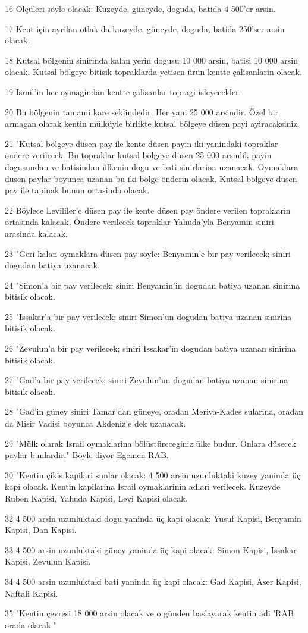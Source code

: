\par 16 Ölçüleri söyle olacak: Kuzeyde, güneyde, doguda, batida 4 500'er arsin.
\par 17 Kent için ayrilan otlak da kuzeyde, güneyde, doguda, batida 250'ser arsin olacak.
\par 18 Kutsal bölgenin sinirinda kalan yerin dogusu 10 000 arsin, batisi 10 000 arsin olacak. Kutsal bölgeye bitisik topraklarda yetisen ürün kentte çalisanlarin olacak.
\par 19 Israil'in her oymagindan kentte çalisanlar topragi isleyecekler.
\par 20 Bu bölgenin tamami kare seklindedir. Her yani 25 000 arsindir. Özel bir armagan olarak kentin mülküyle birlikte kutsal bölgeye düsen payi ayiracaksiniz.
\par 21 "Kutsal bölgeye düsen pay ile kente düsen payin iki yanindaki topraklar öndere verilecek. Bu topraklar kutsal bölgeye düsen 25 000 arsinlik payin dogusundan ve batisindan ülkenin dogu ve bati sinirlarina uzanacak. Oymaklara düsen paylar boyunca uzanan bu iki bölge önderin olacak. Kutsal bölgeye düsen pay ile tapinak bunun ortasinda olacak.
\par 22 Böylece Levililer'e düsen pay ile kente düsen pay öndere verilen topraklarin ortasinda kalacak. Öndere verilecek topraklar Yahuda'yla Benyamin siniri arasinda kalacak.
\par 23 "Geri kalan oymaklara düsen pay söyle: Benyamin'e bir pay verilecek; siniri dogudan batiya uzanacak.
\par 24 "Simon'a bir pay verilecek; siniri Benyamin'in dogudan batiya uzanan sinirina bitisik olacak.
\par 25 "Issakar'a bir pay verilecek; siniri Simon'un dogudan batiya uzanan sinirina bitisik olacak.
\par 26 "Zevulun'a bir pay verilecek; siniri Issakar'in dogudan batiya uzanan sinirina bitisik olacak.
\par 27 "Gad'a bir pay verilecek; siniri Zevulun'un dogudan batiya uzanan sinirina bitisik olacak.
\par 28 "Gad'in güney siniri Tamar'dan güneye, oradan Meriva-Kades sularina, oradan da Misir Vadisi boyunca Akdeniz'e dek uzanacak.
\par 29 "Mülk olarak Israil oymaklarina bölüstüreceginiz ülke budur. Onlara düsecek paylar bunlardir." Böyle diyor Egemen RAB.
\par 30 "Kentin çikis kapilari sunlar olacak: 4 500 arsin uzunluktaki kuzey yaninda üç kapi olacak. Kentin kapilarina Israil oymaklarinin adlari verilecek. Kuzeyde Ruben Kapisi, Yahuda Kapisi, Levi Kapisi olacak.
\par 32 4 500 arsin uzunluktaki dogu yaninda üç kapi olacak: Yusuf Kapisi, Benyamin Kapisi, Dan Kapisi.
\par 33 4 500 arsin uzunluktaki güney yaninda üç kapi olacak: Simon Kapisi, Issakar Kapisi, Zevulun Kapisi.
\par 34 4 500 arsin uzunluktaki bati yaninda üç kapi olacak: Gad Kapisi, Aser Kapisi, Naftali Kapisi.
\par 35 "Kentin çevresi 18 000 arsin olacak ve o günden baslayarak kentin adi 'RAB orada olacak."


